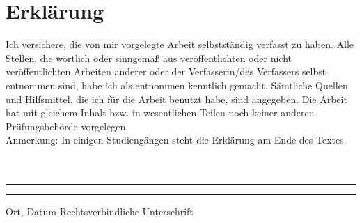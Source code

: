 \section*{Erklärung}
Ich versichere, die von mir vorgelegte Arbeit selbstständig verfasst zu haben. Alle Stellen, die wörtlich oder sinngemäß aus veröffentlichten oder nicht veröffentlichten Arbeiten anderer oder der Verfasserin/des Verfassers selbst entnommen sind, habe ich als entnommen kenntlich gemacht. Sämtliche Quellen und Hilfsmittel, die ich für die Arbeit benutzt habe, sind angegeben. Die Arbeit hat mit gleichem Inhalt bzw. in wesentlichen Teilen noch keiner anderen Prüfungsbehörde vorgelegen.\\
Anmerkung: In einigen Studiengängen steht die Erklärung am Ende des Textes.\\
~\\
~\\
\rule{0.35\textwidth}{0.4pt} \hspace*{3cm} \rule{0.45\textwidth}{0.4pt} \newline
Ort, Datum	\hspace*{6.5cm}	Rechtsverbindliche Unterschrift





